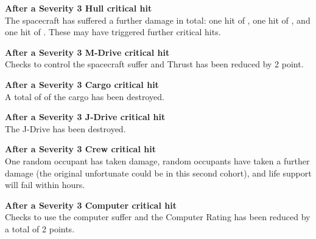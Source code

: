 \documentclass{cheatsheet}
\begin{document}
\begin{landscape}
\textbf{After a Severity 3 Hull critical hit}\\
The spacecraft has suffered a further  damage in total: one
hit of , one hit of , and one hit of .
These may have triggered further critical hits.

\textbf{After a Severity 3 M-Drive critical hit}\\
Checks to control the spacecraft suffer  and Thrust has
been reduced by 2 point.

\textbf{After a Severity 3 Cargo critical hit}\\
A total of  of the cargo has been
destroyed.

\textbf{After a Severity 3 J-Drive critical hit}\\
The J-Drive has been destroyed.

\textbf{After a Severity 3 Crew critical hit}\\
One random occupant has taken  damage,  random
occupants have taken a further  damage (the original
unfortunate could be in this second cohort), and life support will
fail within  hours.

\textbf{After a Severity 3 Computer critical hit}\\
Checks to use the computer suffer  and the Computer Rating
has been reduced by a total of 2 points.

\end{landscape}
\end{document}
